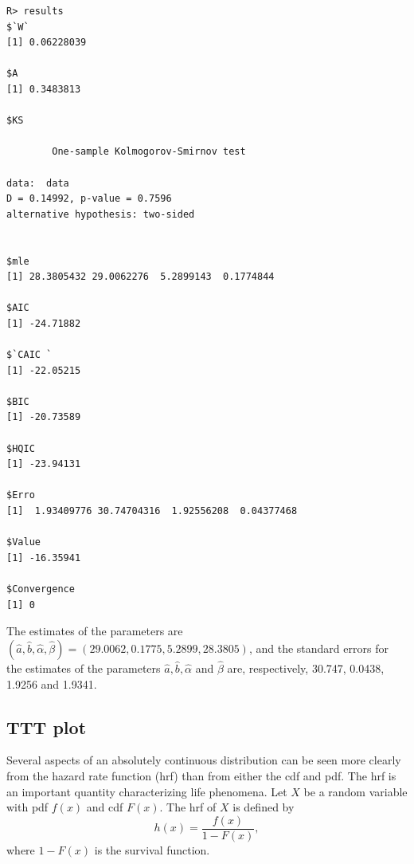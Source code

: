 \documentclass[10pt,letterpaper]{article}
\begin{document}
{\begin{verbatim}
R> results
$`W`
[1] 0.06228039

$A
[1] 0.3483813

$KS

        One-sample Kolmogorov-Smirnov test

data:  data
D = 0.14992, p-value = 0.7596
alternative hypothesis: two-sided


$mle
[1] 28.3805432 29.0062276  5.2899143  0.1774844

$AIC
[1] -24.71882

$`CAIC `
[1] -22.05215

$BIC
[1] -20.73589

$HQIC
[1] -23.94131

$Erro
[1]  1.93409776 30.74704316  1.92556208  0.04377468

$Value
[1] -16.35941

$Convergence
[1] 0
\end{verbatim}

The estimates of the parameters are
$(\widehat{a},\widehat{b},\widehat{\alpha},\widehat{\beta}) = (29.0062, 0.1775, 5.2899, 28.3805)$, and
the standard errors for the estimates of the parameters $\widehat{a}, \widehat{b}, \widehat{\alpha}$ and $\widehat{\beta}$
are, respectively, 30.747, 0.0438, 1.9256 and 1.9341.
}


\subsection{TTT plot}

Several aspects of an absolutely continuous distribution can be seen more clearly from the hazard rate function (hrf) than from either the cdf and pdf. 
The hrf is an important quantity characterizing life phenomena. Let $X$ be a random variable with pdf $f(x)$ and cdf $F(x)$. The hrf of $X$ is defined 
by
\begin{equation*}
h(x) = \frac{f(x)}{1-F(x)},
\end{equation*}
where $1 - F(x)$ is the survival function.
\end{document}
